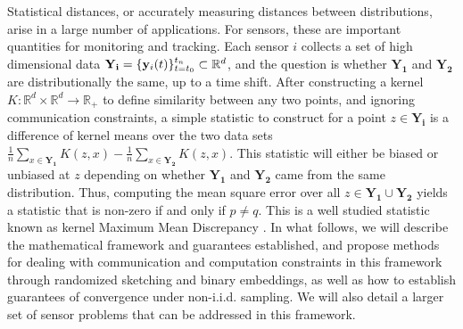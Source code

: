 Statistical distances, or accurately measuring distances between distributions, arise in a large number of applications.  For sensors, these are important quantities for monitoring and tracking.
Each sensor $i$ collects a set of high dimensional data $\mathbf{Y_i}=\{\mathbf{y}_i(t)\}_{t=t_0}^{t_n}\subset \mathbb{R}^d$, and the question is whether $\mathbf{Y_1}$ and $\mathbf{Y_2}$ are distributionally the same, up to a time shift.  After constructing a kernel $K: \mathbb{R}^d\times \mathbb{R}^d \rightarrow \mathbb{R}_+$ to define similarity between any two points, and ignoring communication constraints, a simple statistic to construct for a point $z \in \mathbf{Y_i}$ is a difference of kernel means over the two data sets $\frac{1}{n}\sum_{x\in \mathbf{Y_1}} K(z,x) - \frac{1}{n}\sum_{x\in \mathbf{Y_2}} K(z,x)$.  This statistic will either be biased or unbiased at $z$ depending on whether $\mathbf{Y_1}$ and $\mathbf{Y_2}$ came from the same distribution. %
Thus, computing the mean square error over all $z\in \mathbf{Y_1}\cup \mathbf{Y_2}$ yields a statistic that is non-zero if and only if $p\neq q$.
This is a well studied statistic known as kernel Maximum Mean Discrepancy \cite{gretton2012kernel}.  In what follows, we will describe the mathematical framework and guarantees established, and propose methods for dealing with communication and computation constraints in this framework through randomized sketching and binary embeddings, as well as how to establish guarantees of convergence under non-i.i.d. sampling.%
We will also detail a larger set of sensor problems that can be addressed in this framework.


